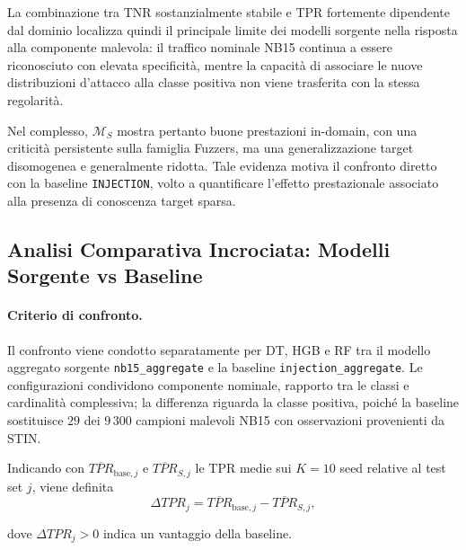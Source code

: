 La combinazione tra TNR sostanzialmente stabile e TPR fortemente dipendente dal dominio localizza quindi il principale limite dei modelli sorgente nella risposta alla componente malevola: il traffico nominale NB15 continua a essere riconosciuto con elevata specificità, mentre la capacità di associare le nuove distribuzioni d'attacco alla classe positiva non viene trasferita con la stessa regolarità.

Nel complesso, $\mathcal{M}_{S}$ mostra pertanto buone prestazioni in-domain, con una criticità persistente sulla famiglia Fuzzers, ma una generalizzazione target disomogenea e generalmente ridotta. 
Tale evidenza motiva il confronto diretto con la baseline \texttt{INJECTION}, volto a quantificare l'effetto prestazionale associato alla presenza di conoscenza target sparsa.



\subsection{Analisi Comparativa Incrociata: Modelli Sorgente vs Baseline}
\label{subsec:analisi_incrociata_sorgente_baseline}

\paragraph{Criterio di confronto.}
Il confronto viene condotto separatamente per DT, HGB e RF tra il modello aggregato sorgente \texttt{nb15\_aggregate} e la baseline \texttt{injection\_aggregate}. 
Le configurazioni condividono componente nominale, rapporto tra le classi e cardinalità complessiva; la differenza riguarda la classe positiva, poiché la baseline sostituisce $29$ dei $9\,300$ campioni malevoli NB15 con osservazioni provenienti da STIN.

Indicando con $\overline{TPR}_{\mathrm{base},j}$ e $\overline{TPR}_{S,j}$ le TPR medie sui $K=10$ seed relative al test set $j$, viene definita
\begin{equation}
    \Delta TPR_j =
    \overline{TPR}_{\mathrm{base},j}
    -
    \overline{TPR}_{S,j},
    \label{eq:delta_tpr_source_baseline}
\end{equation}

dove $\Delta TPR_j>0$ indica un vantaggio della baseline.

